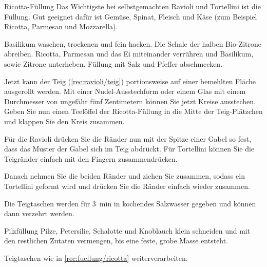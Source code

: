\begin{recipe}{Ricotta-Füllung}{}{}
    \freeform Das Wichtigste bei selbstgemachten Ravioli und Tortellini ist die Füllung. Gut geeignet dafür ist Gemüse, Spinat, Fleisch und Käse (zum Beispiel Ricotta, Parmesan und Mozzarella).

    Basilikum waschen, trockenen und fein hacken. Die Schale der halben Bio-Zitrone abreiben. Ricotta, Parmesan und das Ei miteinander verrühren und Basilikum, sowie Zitrone unterheben. Füllung mit Salz und Pfeffer abschmecken.

    \newstep
    Jetzt kann der Teig (\cref{rec:ravioli/teig}) portionsweise auf einer bemehlten Fläche ausgerollt werden. Mit einer Nudel-Ausstechform oder einem Glas mit einem Durchmesser von ungefähr fünf Zentimetern können Sie jetzt Kreise ausstechen. Geben Sie nun einen Teelöffel der Ricotta-Füllung in die Mitte der Teig-Plätzchen und klappen Sie den Kreis zusammen.

    Für die Ravioli drücken Sie die Ränder nun mit der Spitze einer Gabel so fest, dass das Muster der Gabel sich im Teig abdrückt. Für Tortellini können Sie die Teigränder einfach mit den Fingern zusammendrücken.

    Danach nehmen Sie die beiden Ränder und ziehen Sie zusammen, sodass ein Tortellini geformt wird und drücken Sie die Ränder einfach wieder zusammen.

    \newstep
    Die Teigtaschen werden für \SI{3}{\minute} in kochendes Salzwasser gegeben und können dann verzehrt werden.
    \freeform\hrulefill
\end{recipe}

\clearpage
\begin{recipe}{Pilzfüllung}{}{}
    Pilze, Petersilie, Schalotte und Knoblauch klein schneiden und mit den restlichen Zutaten vermengen, bis eine feste, grobe Masse entsteht.

    \newstep
    Teigtaschen wie in \cref{rec:fuellung/ricotta} weiterverarbeiten.
    \freeform\hrulefill
\end{recipe}

